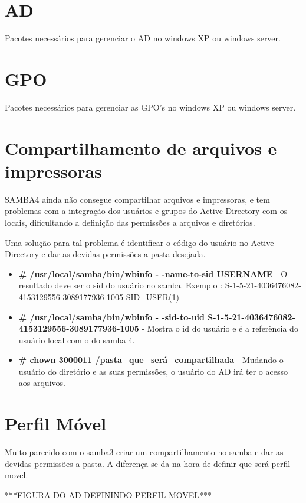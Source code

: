 \section{AD}

Pacotes necessários para gerenciar o AD no windows XP ou windows server.

\section{GPO}

Pacotes necessários para gerenciar as GPO's no windows XP ou windows server.

\section{Compartilhamento de arquivos e impressoras}

SAMBA4 ainda não consegue compartilhar arquivos e impressoras, e tem problemas com a integração dos usuários e grupos do Active Directory com os locais, dificultando a definição das permissões a arquivos e diretórios.

Uma solução para tal problema é identificar o código do usuário no Active Directory e dar as devidas permissões a pasta desejada.

\begin{itemize}
	\item \textbf{\# /usr/local/samba/bin/wbinfo - -name-to-sid USERNAME} - O resultado deve ser o sid do usuário no samba. Exemplo : S-1-5-21-4036476082-4153129556-3089177936-1005 SID\_USER(1)
	\item \textbf{\# /usr/local/samba/bin/wbinfo - -sid-to-uid S-1-5-21-4036476082-4153129556-3089177936-1005} - Mostra o id do usuário e é a referência do usuário local com o do samba 4.
	\item \textbf{\# chown 3000011 /pasta\_que\_será\_compartilhada} - Mudando o usuário do diretório e as suas permissões, o usuário do AD irá ter o acesso aos arquivos.
\end{itemize} 

\section{Perfil Móvel}

Muito parecido com o samba3 criar um compartilhamento no samba e dar as devidas permissões a pasta. A diferença se da na hora de definir que será perfil movel.

***FIGURA DO AD DEFININDO PERFIL MOVEL***

